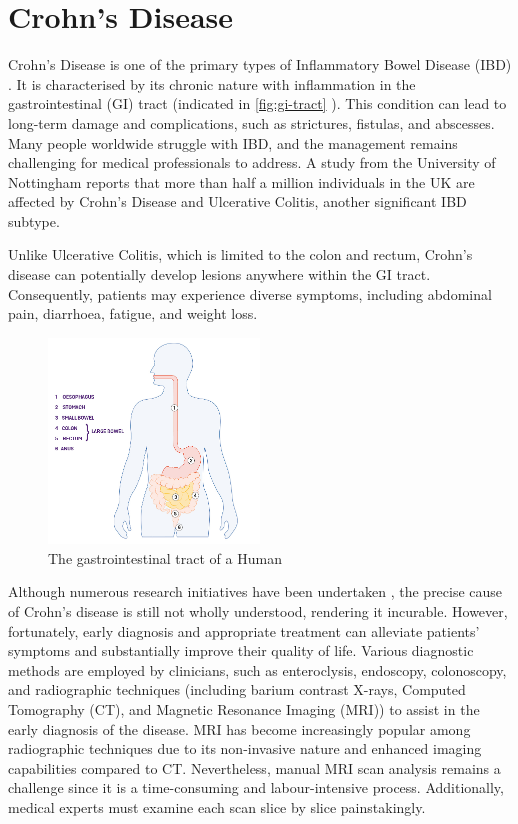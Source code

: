 \section{Crohn's Disease}
Crohn's Disease \cite{baumgart2012crohn,crohnsNHS} is one of the primary types of Inflammatory Bowel Disease (IBD) \cite{IBDCDC}. It is characterised by its chronic nature with inflammation in the gastrointestinal (GI) tract (indicated in \autoref{fig:gi-tract} \cite{digestio98:online}). This condition can lead to long-term damage and complications, such as strictures, fistulas, and abscesses. Many people worldwide struggle with IBD, and the management remains challenging for medical professionals to address. A study from the University of Nottingham \cite{UoNResearch} reports that more than half a million individuals in the UK are affected by Crohn's Disease and Ulcerative Colitis, another significant IBD subtype. 

Unlike Ulcerative Colitis, which is limited to the colon and rectum, Crohn's disease can potentially develop lesions anywhere within the GI tract. Consequently, patients may experience diverse symptoms, including abdominal pain, diarrhoea, fatigue, and weight loss.
\begin{figure}[htp]
    \centering
    \includegraphics[width=0.5\textwidth]{figures/digestion-graphic.jpg}
    \caption{The gastrointestinal tract of a Human}
    \label{fig:gi-tract}
\end{figure}

Although numerous research initiatives have been undertaken \cite{hoarau2016bacteriome,feuerstein2021aga}, the precise cause of Crohn's disease is still not wholly understood, rendering it incurable. However, fortunately, early diagnosis and appropriate treatment can alleviate patients' symptoms and substantially improve their quality of life. Various diagnostic methods are employed by clinicians, such as enteroclysis, endoscopy, colonoscopy, and radiographic techniques (including barium contrast X-rays, Computed Tomography (CT), and Magnetic Resonance Imaging (MRI)) to assist in the early diagnosis of the disease. MRI has become increasingly popular among radiographic techniques due to its non-invasive nature and enhanced imaging capabilities compared to CT. Nevertheless, manual MRI scan analysis remains a challenge since it is a time-consuming and labour-intensive process. Additionally, medical experts must examine each scan slice by slice painstakingly.

